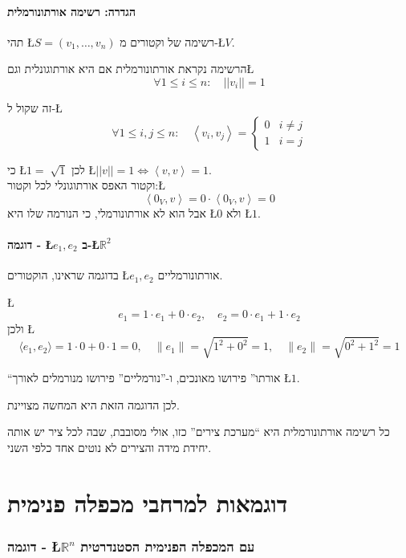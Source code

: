 \documentclass[english,hebrew]{article}
\begin{document}
\subsection{הגדרה: רשימה אורתונורמלית}

תהי \L{$S=\left(v_{1},\dots,v_{n}\right)$} רשימה של וקטורים מ-\L{$V$}.

הרשימה נקראת אורתונורמלית אם היא אורתוגונלית וגם\L{%
\[
\forall1\le i\le n:\quad\left|\left|v_{i}\right|\right|=1
\]
}%

זה שקול ל-\L{%
\[
\forall1\le i,j\le n:\quad\left\langle v_{i},v_{j}\right\rangle =\begin{cases}
0 & i\ne j\\
1 & i=j
\end{cases}
\]
}%

כי \L{$1=\sqrt[]{1}$} לכן \L{$\left|\left|v\right|\right|=1\iff\left\langle v,v\right\rangle =1$}.\\

וקטור האפס אורתוגונלי לכל וקטור:\L{%
\[
\left\langle 0_{V},v\right\rangle =0\cdot\left\langle 0_{V},v\right\rangle =0
\]
}%
 אבל הוא לא אורתונורמלי, כי הנורמה שלו היא \L{$0$} ולא \L{$1$}.

\subsection{דוגמה - \L{$e_{1},e_{2}$} ב-\L{$\mathbb{R}^{2}$}}

בדוגמה שראינו, הוקטורים \L{$e_{1},e_{2}$} אורתונורמליים.

\L{%
\[
e_{1}=1\cdot e_{1}+0\cdot e_{2},\quad e_{2}=0\cdot e_{1}+1\cdot e_{2}
\]
}%
ולכן \L{%
\[
\langle e_{1},e_{2}\rangle=1\cdot0+0\cdot1=0,\quad\|e_{1}\|=\sqrt{1^{2}+0^{2}}=1,\quad\|e_{2}\|=\sqrt{0^{2}+1^{2}}=1
\]
}%

\textquotedblleft אורתו\textquotedblright{} פירושו מאונכים, ו-\textquotedblright נורמליים\textquotedblright{}
פירושו מנורמלים לאורך \L{$1$}. 

לכן הדוגמה הזאת היא המחשה מצויינת.

כל רשימה אורתונורמלית היא \textquotedblleft מערכת צירים\textquotedblright{}
כזו, אולי מסובבת, שבה לכל ציר יש אותה יחידת מידה והצירים לא נוטים
אחד כלפי השני.

\part{דוגמאות למרחבי מכפלה פנימית}

\section{דוגמה - \L{$\mathbb{R}^{n}$} עם המכפלה הפנימית הסטנדרטית}
\end{document}

